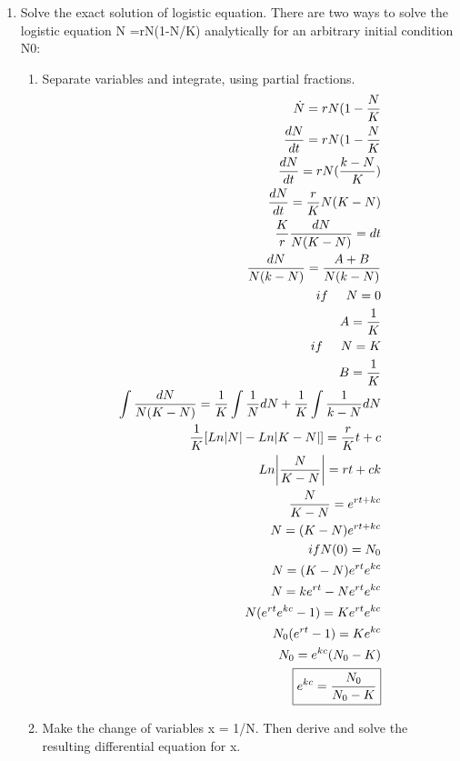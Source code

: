 \documentclass[a4paper,10pt]{article}
\begin{document}
\begin{enumerate}
    \newpage    
    \item 
    Solve the exact solution of logistic equation. There are two ways to solve the logistic equation N =rN(1-N/K) analytically for an arbitrary initial condition N0:
    \begin{enumerate}
		\item Separate variables and integrate, using partial fractions.
		    \begin{equation}
		        \begin{aligned}
		            \dot{N}= rN(1-\frac{N}{K}\\
		            \frac{dN}{dt}= rN(1- \frac{N}{K}\\
		            \frac{dN}{dt}= rN(\frac{k-N}{K})\\
		            \frac{dN}{dt}=\frac{r}{K}N(K-N)\\
		            \frac{K}{r}\frac{dN}{N(K-N)}=dt\\
		            \frac{dN}{N(k-N)}= \frac{A+B}{N(k-N)}\\
		            if \hspace{0.5cm} N=0\\
		            A= \frac{1}{K}\\
		            if \hspace{0.5cm} N=K\\
		            B= \frac{1}{K}\\
		            \int\frac{dN}{N(K-N)}=\frac{1}{K}\int\frac{1}{N}dN + \frac{1}{K}\int\frac{1}{k-N}dN\\
		            \frac{1}{K}[Ln\abs{N}- Ln\abs{K-N} ]=\frac{r}{K}t + c\\
		            Ln\abs{\frac{N}{K-N}}= rt + ck\\
		            \frac{N}{K-N}= e^{rt+kc}\\
		            N= (K-N)e^{rt+kc}\\
		            if N(0)=N_{0}\\
		            N= (K-N)e^{rt}e^{kc}\\
		            N= ke^{rt}-Ne^{rt}e^{kc}\\
		            N(e^{rt}e^{kc}-1)=Ke^{rt}e^{kc}\\
		            N_{0}(e^{rt}-1)=Ke^{kc}\\
		            N_{0}=e^{kc}(N_{0}-K)\\
		            \boxed{e^{kc}=\frac{N_{0}}{N_{0}-K}}
		        \end{aligned}
		    \end{equation}
		\newpage 
        \item Make the change of variables x = 1/N. Then derive and solve the resulting differential equation for x.

\end{enumerate}
\end{enumerate}
\end{document}
